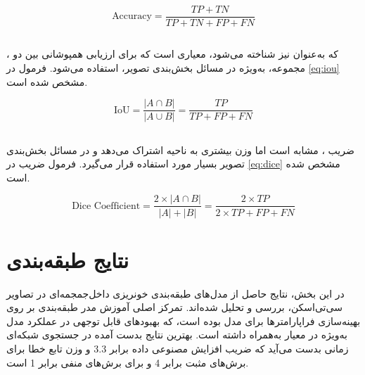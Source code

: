 \begin{latin}
\begin{equation}
\label{eq:accuracy}
\text{Accuracy} = \frac{TP + TN}{TP + TN + FP + FN}
\end{equation}
\end{latin}

\subsection{}

، که به‌عنوان  نیز شناخته می‌شود، معیاری است که برای ارزیابی همپوشانی بین دو مجموعه، به‌ویژه در مسائل بخش‌بندی تصویر، استفاده می‌شود. فرمول  در \autoref{eq:iou} مشخص شده است.

\begin{latin}
\begin{equation}
\label{eq:iou}
\text{IoU} = \frac{|A \cap B|}{|A \cup B|} = \frac{TP}{TP + FP + FN}
\end{equation}
\end{latin}

\subsection{}

ضریب ، مشابه  است اما وزن بیشتری به ناحیه اشتراک می‌دهد و در مسائل بخش‌بندی تصویر بسیار مورد استفاده قرار می‌گیرد. فرمول ضریب  در \autoref{eq:dice} مشخص شده است.

\begin{latin}
\begin{equation}
\label{eq:dice}
\text{Dice Coefficient} = \frac{2 \times |A \cap B|}{|A| + |B|} = \frac{2 \times TP}{2 \times TP + FP + FN}
\end{equation}
\end{latin}

\section{نتایج طبقه‌بندی}

در این بخش، نتایج حاصل از مدل‌های طبقه‌بندی خونریزی داخل‌جمجمه‌ای در تصاویر سی‌تی‌اسکن، بررسی و تحلیل شده‌اند. تمرکز اصلی آموزش مدر طبقه‌بندی بر روی بهینه‌سازی فراپارامترها برای مدل
  بوده است، که بهبودهای قابل توجهی در عملکرد مدل به‌ویژه در معیار 
   به‌همراه داشته است. بهترین نتایج بدست آمده در جستجوی شبکه‌ای زمانی بدست می‌آید که ضریب افزایش مصنوعی داده برابر 
   $3.3$
و وزن تابع خطا
برای برش‌های مثبت برابر 4 و برای برش‌های منفی برابر 1 است.

